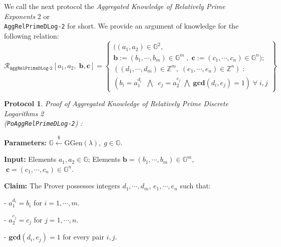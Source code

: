 \documentclass[11pt, lettersize, notitlepage, leqno, footskip=0.6cm]{article}
\newcommand{\bz}{\mathbb Z}
\newcommand{\ttt}{\texttt}
\newcommand{\mc}{\mathcal}
\newcommand{\mb}{\mathbb}
\newcommand{\mbf}{\mathbf}
\newcommand{\mr}{\mathrm}
\newcommand{\lamb}{\lambda}
\newcommand{\GCD}{\mbf{gcd}}
\newtheorem{Prot}[Thm]{Protocol}
\numberwithin{equation}{section}
\begin{document}
We call the next protocol the \textit{Aggregated Knowledge of Relatively Prime Exponents} 2 or\\ \verb|AggRelPrimeDLog-2| for short. We provide an argument of knowledge for the following relation: \[
  \mc{R}_{\ttt{AggRelPrimeDLog-2}}[a_1, a_2,\; \mbf{b}, \mbf{c}] = \left\{\begin{array}{l}
    ((a_1,a_2)\in\mb{G}^2,\;\\
     \mbf{b}:=(b_1,\cdots, b_m)\in\mb{G}^m\;,\;\mbf{c}:= (c_1,\cdots, c_n)\in\mb{G}^n);\\
    ((d_1,\cdots,d_m)\in\bz^m,\; (e_1,\cdots,e_n)\in\bz^n)\;: \\
    (b_i = a_1^{d_i}\;\;\bigwedge\;\; c_j = a_2^{e_j}\;\bigwedge\; \GCD(d_i, e_j) = 1)\;\forall \;i,j   	
  \end{array}\right\}
\]  \vspace{0.1cm}


\begin{Prot} \normalfont \hypertarget{RP2}{\textit{Proof of Aggregated Knowledge of Relatively Prime Discrete Logarithms} 2}\\ (\verb|PoAggRelPrimeDLog-2|) :\end{Prot}\vspace{-0.3cm}

\noindent \textbf{Parameters:} $\mb{G}\xleftarrow{\$} \mr{GGen}(\lamb), \; g\in \mb{G}$.

\noindent \textbf{Input:} Elements $a_1, a_2\in \mb{G}$; Elements $\mbf{b} = (b_1,\cdots, b_m)\in\mb{G}^m$, $\;\mbf{c} = (c_1,\cdots, c_n)\in\mb{G}^n$.

\noindent \textbf{Claim:} The Prover possesses integers $d_1,\cdots, d_m$,\; $e_1,\cdots,e_n$ such that:

\noindent - $a_1^{d_i} = b_i$ for $i = 1,\cdots, m$.

\noindent - $a_2^{e_j} = c_j$ for $j = 1,\cdots, n$.

\noindent - $\GCD(d_i, e_j) = 1$ for every pair $i, j$.
\end{document}
